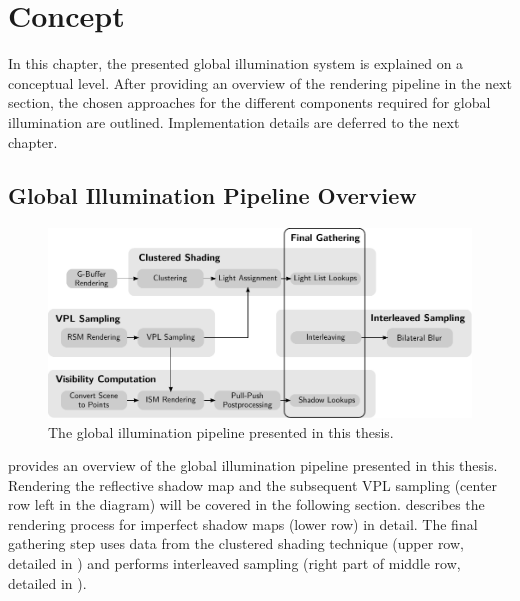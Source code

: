 
\chapter{Concept}
\label{chap:concept}

In this chapter, the presented global illumination system is explained on a conceptual level. After providing an overview of the rendering pipeline in the next section, the chosen approaches for the different components required for global illumination are outlined. Implementation details are deferred to the next chapter.

\section{Global Illumination Pipeline Overview}
\label{sec:concept:overview}

\begin{figure}[h]
    \includegraphics[width=\textwidth]{graphics/GI_pipeline_concept}
    \caption{The global illumination pipeline presented in this thesis.}
    \label{fig:GIPipelineConcept}
\end{figure}



 provides an overview of the global illumination pipeline presented in this thesis.
Rendering the reflective shadow map and the subsequent VPL sampling (center row left in the diagram) will be covered in the following section.
 describes the rendering process for imperfect shadow maps (lower row) in detail.
The final gathering step uses data from the clustered shading technique (upper row, detailed in ) and performs interleaved sampling (right part of middle row, detailed in ).

